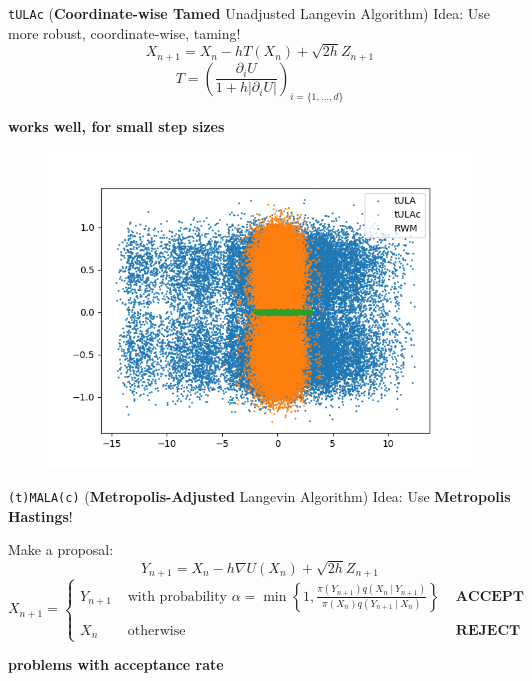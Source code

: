 \documentclass[aspectratio=169]{beamer}
\newcommand{\grad}{\nabla}
\begin{document}
\begin{frame}{\texttt{tULAc} (\textbf{Coordinate-wise Tamed} Unadjusted Langevin Algorithm)}
    Idea: Use more robust, coordinate-wise, taming!
        \[ X_{n+1} = X_n -hT(X_n) +\sqrt{2h}Z_{n+1} \] \[\]
        \[T=\left(\frac{\partial_i U}{1+h|\partial_i U|}\right)_{i=\lbrace 1, \dots, d\rbrace}\]
   \[\]
   \[\]
   \centerline{\textbf{works well, for small step sizes}}
\end{frame}

\begin{frame}
\begin{figure}
    \centering
    \includegraphics[width=0.8\linewidth]{Figures/transparentBoth.png}
\end{figure}
\end{frame}


\begin{frame}{\texttt{(t)MALA(c)} (\textbf{Metropolis-Adjusted} Langevin Algorithm)}
    Idea: Use \textbf{Metropolis Hastings}!
    
        Make a proposal:
        \[ Y_{n+1} = X_n - h\grad U(X_n)  + \sqrt{2h}Z_{n+1}\] \[\]
        \[ X_{n+1} = \begin{cases}
            Y_{n+1} & \text{ with probability } \alpha = \min \left\lbrace 1, \frac{ \pi\left( Y_{n+1}\right) q (X_n\ |\ Y_{n+1}) } { \pi\left( X_n\right) q (Y_{n+1}\ |\ X_n) } \right\rbrace & \textbf{ ACCEPT } \\ \\ 
            X_n & \text{ otherwise } & \textbf{ REJECT }
        \end{cases}\]
   \[\]
   \[\]
   \centerline{\textbf{problems with acceptance rate}}
\end{frame}
\end{document}
